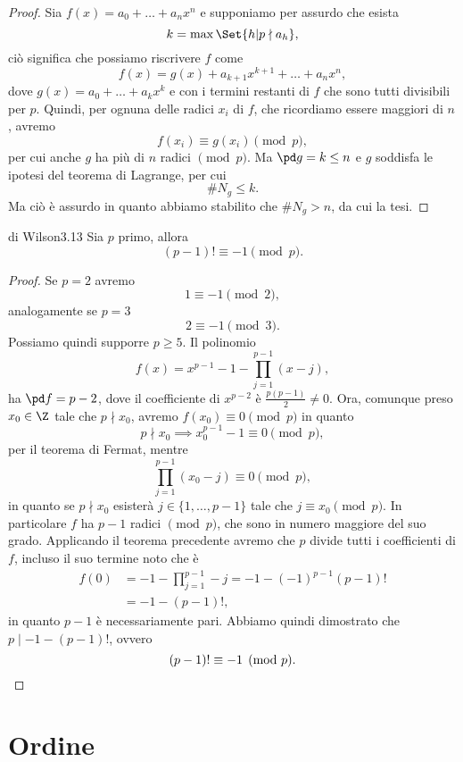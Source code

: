 \begin{proof}
	Sia \(f(x) = a_0+\ldots+a_n x^n\) e supponiamo per assurdo che esista
	\[
		k = \max\Set{h | p\nmid a_h},
	\]
	ciò significa che possiamo riscrivere \(f\) come
	\[
		f(x) = g(x) + a_{k+1} x^{k+1} + \ldots + a_n x^n,
	\]
	dove \(g(x) = a_0+\ldots+a_k x^k\) e con i termini restanti di \(f\) che sono tutti divisibili per \(p\).
	Quindi, per ognuna delle radici \(x_i\) di \(f\), che ricordiamo essere maggiori di \(n\), avremo
	\[
		f(x_i) \equiv g(x_i) \pmod{p},
	\]
	per cui anche \(g\) ha più di \(n\) radici \(\pmod{p}\).
	Ma \(\pd g=k\le n\) e \(g\) soddisfa le ipotesi del teorema di Lagrange, per cui
	\[
		\# N_g \le k.
	\]
	Ma ciò è assurdo in quanto abbiamo stabilito che \(\# N_g > n\), da cui la tesi.
\end{proof}

\begin{teor}{di Wilson}{3.13}
	Sia \(p\) primo, allora
	\[
		(p-1)! \equiv -1 \pmod{p}.
	\]
\end{teor}

\begin{proof}
	Se \(p=2\) avremo
	\[
		1 \equiv -1 \pmod{2},
	\]
	analogamente se \(p=3\)
	\[
		2 \equiv -1 \pmod{3}.
	\]
	Possiamo quindi supporre \(p\ge 5\).
	Il polinomio
	\[
		f(x) = x^{p-1}-1-\prod_{j=1}^{p-1} (x-j),
	\]
	ha \(\pd f = p-2\), dove il coefficiente di \(x^{p-2}\) è \(\frac{p(p-1)}{2} \neq 0\).
	Ora, comunque preso \(x_0\in\Z\) tale che \(p\nmid x_0\), avremo \(f(x_0) \equiv 0 \pmod{p}\) in quanto
	\[
		p\nmid x_0 \implies x_0^{p-1}-1 \equiv 0 \pmod{p},
	\]
	per il teorema di Fermat, mentre
	\[
		\prod_{j=1}^{p-1}(x_0-j) \equiv 0 \pmod{p},
	\]
	in quanto se \(p\nmid x_0\) esisterà \(j\in\{1,\ldots,p-1\}\) tale che \(j\equiv x_0 \pmod{p}\).
	In particolare \(f\) ha \(p-1\) radici \(\pmod{p}\), che sono in numero maggiore del suo grado.
	Applicando il teorema precedente avremo che \(p\) divide tutti i coefficienti di \(f\), incluso il suo termine noto che è
	\[
		\begin{split}
			f(0) & = -1-\prod_{j=1}^{p-1}-j=-1-(-1)^{p-1}(p-1)!\\
			& = -1-(p-1)!,
		\end{split}
	\]
	in quanto \(p-1\) è necessariamente pari.
	Abbiamo quindi dimostrato che \(p\mid -1-(p-1)!\), ovvero
	\[
		(p-1)! \equiv -1 \pmod{p}.\qedhere
	\]
\end{proof}
\section{Ordine}

